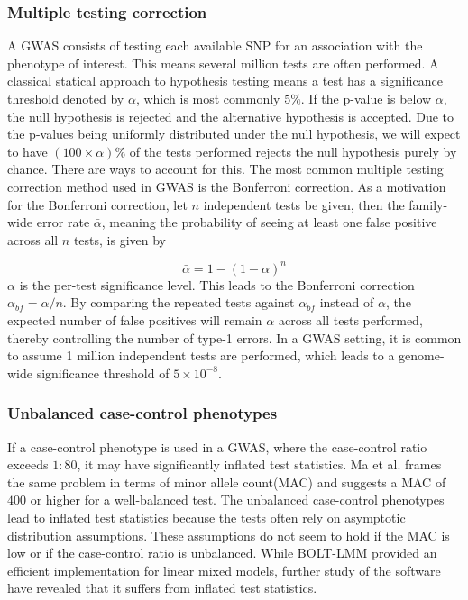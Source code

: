 \subsubsection{Multiple testing correction}
A GWAS consists of testing each available SNP for an association with the phenotype of interest. This means several million tests are often performed. A classical statical approach to hypothesis testing means a test has a significance threshold denoted by $ \alpha $, which is most commonly $ 5\% $. If the p-value is below $ \alpha $, the null hypothesis is rejected and the alternative hypothesis is accepted. Due to the p-values being uniformly distributed under the null hypothesis, we will expect to have $ (100\times \alpha) \%$ of the tests performed rejects the null hypothesis purely by chance. There are ways to account for this. The most common multiple testing correction method used in GWAS is the Bonferroni correction\cite{balding2006tutorial,rice2008methods}. As a motivation for the Bonferroni correction, let $ n $ independent tests be given, then the family-wide error rate $ \bar{\alpha} $, meaning the probability of seeing at least one false positive across all $ n $ tests, is given by

\begin{equation} \label{eq:bonferroni}
\bar{\alpha} = 1 - (1-\alpha)^n 
\end{equation}
$ \alpha$ is the per-test significance level. This leads to the Bonferroni correction $ \alpha_{bf} =  \alpha/n $. By comparing the repeated tests against $ \alpha_{bf} $ instead of $ \alpha $, the expected number of false positives will remain $ \alpha $ across all tests performed, thereby controlling the number of type-1 errors. In a GWAS setting, it is common to assume 1 million independent tests are performed\cite{pe2008estimation}, which leads to a genome-wide significance threshold of $ 5 \times 10^{-8} $.



\subsubsection{Unbalanced case-control phenotypes}
If a case-control phenotype is used in a GWAS, where the case-control ratio exceeds $ 1{:}80 $, it may have significantly inflated test statistics\cite{zhou2018efficiently,}. Ma et al. frames the same problem in terms of minor allele count(MAC) and suggests a MAC of $ 400 $ or higher for a well-balanced test\cite{ma2013recommended}. The unbalanced case-control phenotypes lead to inflated test statistics because the tests often rely on asymptotic distribution assumptions. These assumptions do not seem to hold if the MAC is low or if the case-control ratio is unbalanced. While BOLT-LMM provided an efficient implementation for linear mixed models, further study of the software have revealed that it suffers from inflated test statistics.

